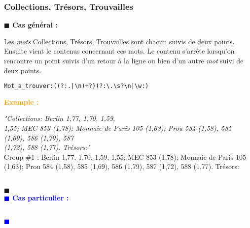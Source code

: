 \documentclass[a4paper, 11pt]{article}
\newenvironment{general}
    {
    \noindent\textbf{\textcolor{dark-blue}{$\blacksquare$  Cas général : \\}}
    }
    {
    ~\\\noindent\textcolor{dark-blue}{$\blacksquare$}\\
    }
\newenvironment{particulier}
    {
    \noindent\textbf{\textcolor{blue}{$\blacksquare$  Cas particulier : \\}}
    }
    {
    \\\noindent\textcolor{blue}{$\blacksquare$}\\
    }
\newenvironment{exemple}
    {
    \noindent\textbf{\textcolor{orange}{
    Exemple : \\}}
    }
    {\\
    }
\begin{document}
\subsubsection{Collections, Trésors, Trouvailles}
\begin{general}
Les \textit{mots} Collections, Trésors, Trouvailles sont chacun suivis de deux points. Ensuite vient le contenus concernant ces mots. Le contenu s'arrête lorsqu'on rencontre un point suivis d'un retour à la ligne ou bien d'un autre \textit{mot} suivi de deux points.
\begin{verbatim}
Mot_a_trouver:((?:.|\n)+?)(?:\.\s?\n|\w:)
\end{verbatim}
\begin{exemple}
\emph{"Collections: Berlin 1,77, 1,70, 1,59, \\
        1,55; MEC 853 (1,78); Monnaie de Paris 105 (1,63); Prou 584 (1,58), 585 (1,69), 586 (1,79), 587 \\
        (1,72), 588 (1,77). Trésors:"}\\
Group \#1 :  Berlin 1,77, 1,70, 1,59,
        1,55; MEC 853 (1,78); Monnaie de Paris 105 (1,63); Prou 584 (1,58), 585 (1,69), 586 (1,79), 587 (1,72), 588 (1,77). Trésors:
\end{exemple}
\end{general}
\begin{particulier}
\end{particulier}
\end{document}
